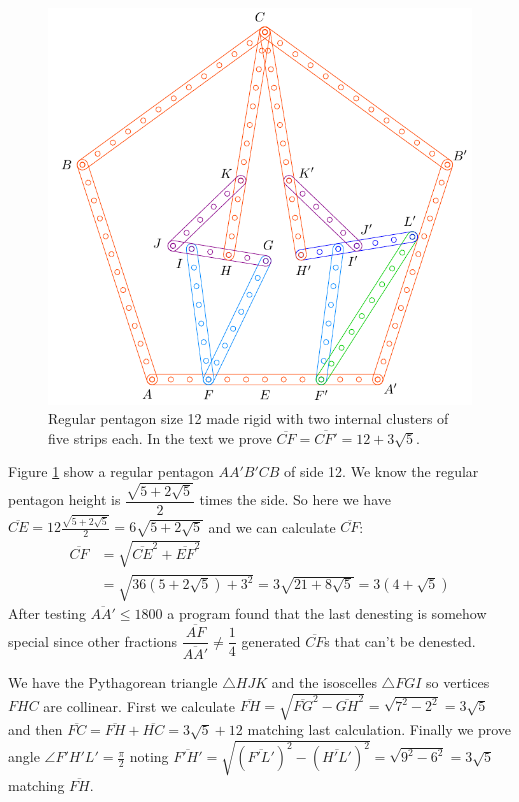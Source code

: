 \documentclass[11pt]{article}
\begin{document}
\begin{figure}[h]
 \centering
 \includegraphics[scale=0.80]{12/penta12-10a}
 \caption{Regular pentagon size 12 made rigid with two internal clusters of five strips each. In the text we prove $\overline{CF} = \overline{CF'} = 12 + 3\sqrt5$.}
 \label{fig:penta12-10a}
\end{figure}

Figure \ref{fig:penta12-10a} show a regular pentagon $AA'B'CB$ of side 12. We know the regular pentagon height is $\dfrac{\sqrt{5+2\sqrt5}}2$ times the side. So here we have $\overline{CE} = 12\frac{\sqrt{5+2\sqrt5}}2 = 6\sqrt{5+2\sqrt5}$ and we can calculate $\overline{CF}$:
\begin{align}
\overline{CF} &= \sqrt{\overline{CE}^2 + \overline{EF}^2}\nonumber\\
 &= \sqrt{36(5+2\sqrt5) + 3^2} = 3\sqrt{21+8\sqrt5} = 3(4+\sqrt5)
\end{align}
After testing $\overline{AA'} \le 1800$ a program found that the last denesting is somehow special since other fractions $\dfrac{\overline{AF}}{\overline{AA'}} \neq \dfrac{1}4$ generated $\overline{CF}$s that can't be denested.

We have the Pythagorean triangle $\triangle{HJK}$ and the isoscelles $\triangle{FGI}$ so vertices $FHC$ are collinear. First we calculate $\overline{FH} = \sqrt{\overline{FG}^2 - \overline{GH}^2} = \sqrt{7^2 - 2^2} = 3\sqrt5$ and then $\overline{FC} = \overline{FH} + \overline{HC} = 3\sqrt{5} + 12$ matching last calculation. Finally we prove angle $\angle{F'H'L'} = \frac{\pi}2$ noting $\overline{F'H'} = \sqrt{(\overline{F'L'})^2 - (\overline{H'L'})^2} = \sqrt{9^2 - 6^2} = 3\sqrt5$ matching $\overline{FH}$.
\end{document}
